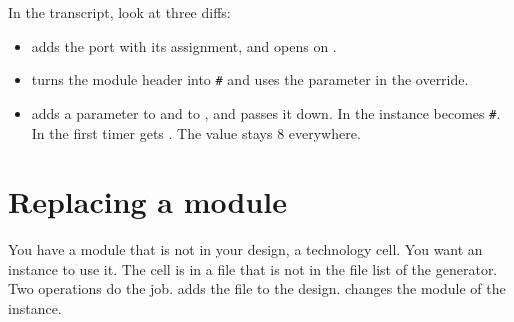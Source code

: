 



In the transcript, look at three diffs:

\begin{itemize}
\item {} adds the port  with its assignment, and opens
   on .
\item {} turns the module header into
  \texttt{\#} and uses the
  parameter in the override.
\item {} adds a parameter  to  and to
  , and passes it down. In  the instance becomes
  \texttt{\#}. In 
  the first timer gets . The value stays 8 everywhere.
\end{itemize}

\section{Replacing a module}

You have a module that is not in your design, a technology cell. You want an
instance to use it. The cell is in a file that is not in the file list of the
generator. Two operations do the job.  adds the file to the
design.  changes the module of the instance.



